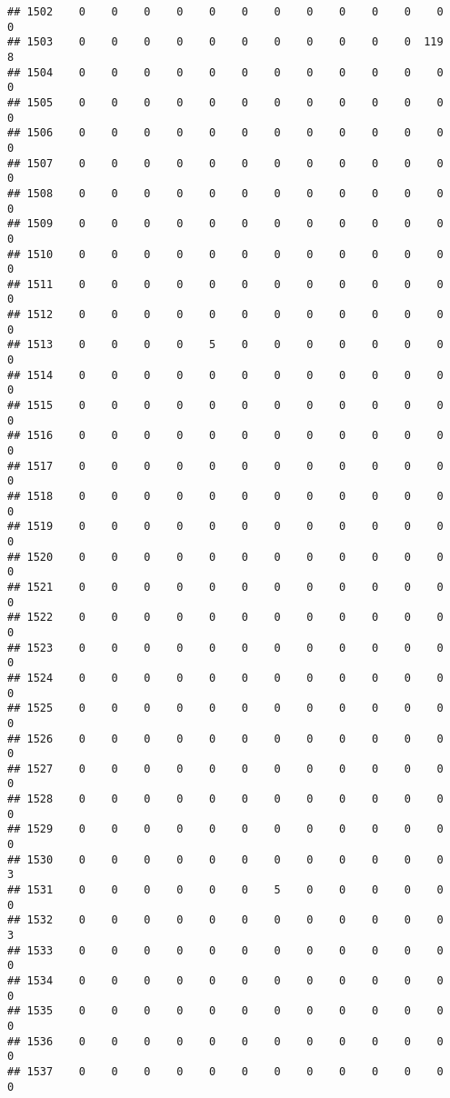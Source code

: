\documentclass[]{article}
\begin{document}
\begin{verbatim}
## 1502    0    0    0    0    0    0    0    0    0    0    0    0    0
## 1503    0    0    0    0    0    0    0    0    0    0    0  119    8
## 1504    0    0    0    0    0    0    0    0    0    0    0    0    0
## 1505    0    0    0    0    0    0    0    0    0    0    0    0    0
## 1506    0    0    0    0    0    0    0    0    0    0    0    0    0
## 1507    0    0    0    0    0    0    0    0    0    0    0    0    0
## 1508    0    0    0    0    0    0    0    0    0    0    0    0    0
## 1509    0    0    0    0    0    0    0    0    0    0    0    0    0
## 1510    0    0    0    0    0    0    0    0    0    0    0    0    0
## 1511    0    0    0    0    0    0    0    0    0    0    0    0    0
## 1512    0    0    0    0    0    0    0    0    0    0    0    0    0
## 1513    0    0    0    0    5    0    0    0    0    0    0    0    0
## 1514    0    0    0    0    0    0    0    0    0    0    0    0    0
## 1515    0    0    0    0    0    0    0    0    0    0    0    0    0
## 1516    0    0    0    0    0    0    0    0    0    0    0    0    0
## 1517    0    0    0    0    0    0    0    0    0    0    0    0    0
## 1518    0    0    0    0    0    0    0    0    0    0    0    0    0
## 1519    0    0    0    0    0    0    0    0    0    0    0    0    0
## 1520    0    0    0    0    0    0    0    0    0    0    0    0    0
## 1521    0    0    0    0    0    0    0    0    0    0    0    0    0
## 1522    0    0    0    0    0    0    0    0    0    0    0    0    0
## 1523    0    0    0    0    0    0    0    0    0    0    0    0    0
## 1524    0    0    0    0    0    0    0    0    0    0    0    0    0
## 1525    0    0    0    0    0    0    0    0    0    0    0    0    0
## 1526    0    0    0    0    0    0    0    0    0    0    0    0    0
## 1527    0    0    0    0    0    0    0    0    0    0    0    0    0
## 1528    0    0    0    0    0    0    0    0    0    0    0    0    0
## 1529    0    0    0    0    0    0    0    0    0    0    0    0    0
## 1530    0    0    0    0    0    0    0    0    0    0    0    0    3
## 1531    0    0    0    0    0    0    5    0    0    0    0    0    0
## 1532    0    0    0    0    0    0    0    0    0    0    0    0    3
## 1533    0    0    0    0    0    0    0    0    0    0    0    0    0
## 1534    0    0    0    0    0    0    0    0    0    0    0    0    0
## 1535    0    0    0    0    0    0    0    0    0    0    0    0    0
## 1536    0    0    0    0    0    0    0    0    0    0    0    0    0
## 1537    0    0    0    0    0    0    0    0    0    0    0    0    0

\end{verbatim}
\end{document}
